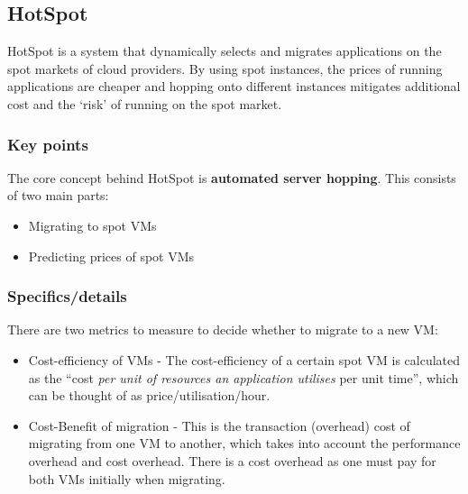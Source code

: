 \documentclass{sty/SizheArticle}
\begin{document}
\subsection{HotSpot}
HotSpot is a system that dynamically selects and migrates applications
on the spot markets of cloud providers. By using spot instances, the prices of
running applications are cheaper and hopping onto different instances mitigates
additional cost and the `risk' of running on the spot market.

\subsubsection{Key points}
The core concept behind HotSpot is \textbf{automated server hopping}. This
consists of two main parts:
\begin{itemize}
\item Migrating to spot VMs
\item Predicting prices of spot VMs
\end{itemize}


\subsubsection{Specifics/details}
There are two metrics to measure to decide whether to migrate to a
new VM:
\begin{itemize}
\item Cost-efficiency of VMs - The cost-efficiency of a certain spot 
VM is calculated as the ``cost
\textit{per unit of resources an application utilises} per unit time'',
which can be thought of as price/utilisation/hour.

\item Cost-Benefit of migration - This is the transaction (overhead) cost
of migrating from one VM to another, which takes into account the
performance overhead and cost overhead. There is a cost overhead as one must
pay for both VMs initially when migrating.
\end{itemize}

\end{document}
